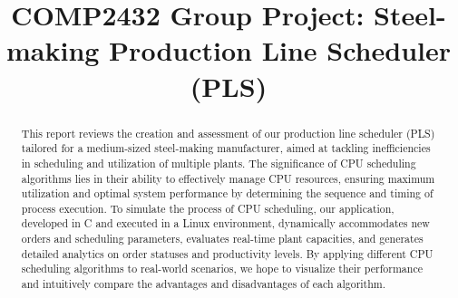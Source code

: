 \documentclass[conference]{IEEEtran}
\begin{document}
\title{COMP2432 Group Project: 
Steel-making Production Line Scheduler (PLS)}

\author{
\and
{}
\and
{}
\and
{}
\and
{}
}

\maketitle

\begin{abstract}
This report reviews the creation and assessment of our production line scheduler (PLS) tailored for a medium-sized steel-making manufacturer, aimed at tackling inefficiencies in scheduling and utilization of multiple plants. The significance of CPU scheduling algorithms lies in their ability to effectively manage CPU resources, ensuring maximum utilization and optimal system performance by determining the sequence and timing of process execution. To simulate the process of CPU scheduling, our application, developed in C and executed in a Linux environment, dynamically accommodates new orders and scheduling parameters, evaluates real-time plant capacities, and generates detailed analytics on order statuses and productivity levels. By applying different CPU scheduling algorithms to real-world scenarios, we hope to visualize their performance and intuitively compare the advantages and disadvantages of each algorithm.
\end{abstract}
\end{document}
